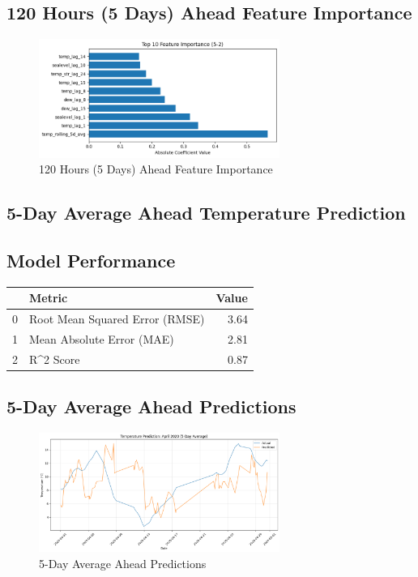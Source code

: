 \subsection{120 Hours (5 Days) Ahead Feature Importance}
\begin{figure}[htbp]
\centering
\includegraphics[width=0.7\textwidth]{5-2-linear_temp_feature_importance.png}
\caption{120 Hours (5 Days) Ahead Feature Importance}
\label{fig:120_hours_(5_days)_ahead_featimp}
\end{figure}



\subsection{5-Day Average Ahead Temperature Prediction}
\subsection{Model Performance}
\begin{tabular}{llr}
\toprule
 & Metric & Value \\
\midrule
0 & Root Mean Squared Error (RMSE) & 3.64 \\
1 & Mean Absolute Error (MAE) & 2.81 \\
2 & R^2 Score & 0.87 \\
\bottomrule
\end{tabular}

\subsection{5-Day Average Ahead Predictions}
\begin{figure}[htbp]
\centering
\includegraphics[width=0.7\textwidth]{5-3-linear_temp_prediction_results.png}
\caption{5-Day Average Ahead Predictions}
\label{fig:5-day_average_ahead_pred}
\end{figure}


